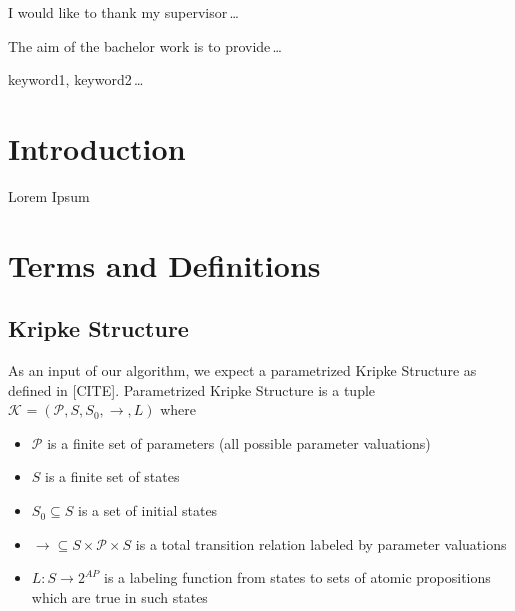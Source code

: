 \documentclass[12pt,oneside,draft]{fithesis2}
\newcommand{\ks}[1][]{\ensuremath{\mathcal{K}_{#1}}}
\newcommand{\fullKs}{\ensuremath{ \ks = (\params, S, S_0, \trans{}, L) }}
\newcommand{\trans}[1]{\stackrel{#1}{\rightarrow}}
\newcommand{\params}{\mathcal{P}}
\begin{document}
  \FrontMatter                    %
    \ThesisTitlePage                %
    \begin{ThesisDeclaration}       %
      \DeclarationText
      \AdvisorName
    \end{ThesisDeclaration}
    \begin{ThesisThanks}            %
      I would like to thank my supervisor\,\dots
    \end{ThesisThanks}
    \begin{ThesisAbstract}          %
      The aim of the bachelor work is to provide\,\dots
    \end{ThesisAbstract}
    \begin{ThesisKeyWords}          %
      keyword1, keyword2\,\dots
    \end{ThesisKeyWords}
    \tableofcontents                %
  
  \MainMatter                     %
    \chapter{Introduction}          %
	Lorem Ipsum \cite{testCite}

	\chapter{Terms and Definitions}
		
		\section{Kripke Structure}
	
			As an input of our algorithm, we expect a parametrized Kripke Structure as defined in [CITE]. Parametrized Kripke Structure is a tuple $\fullKs$ where
			
			\begin{itemize}
				\item $\params$ is a finite set of parameters (all possible parameter valuations)
				\item $S$ is a finite set of states
				\item $S_0 \subseteq S$ is a set of initial states
				\item $\trans{} \subseteq S \times \params \times S$ is a total transition relation labeled by parameter valuations 
				\item $L: S \rightarrow 2^{AP} $ is a labeling function from states to sets of atomic propositions which are true in such states
			\end{itemize} 		
			
\end{document}
